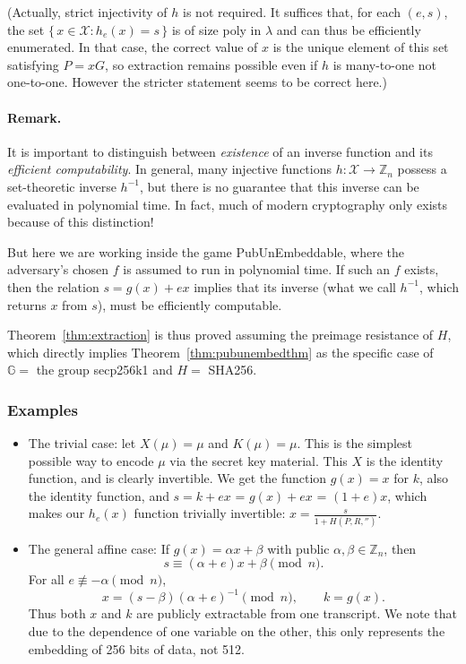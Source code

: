 \documentclass[10pt,a4paper]{article}
\theoremstyle{definition}   %
\theoremstyle{remark}       %
\newcommand{\G}{\mathbb{G}}
\begin{document}
(Actually, strict injectivity of $h$ is not required. It suffices that, for each $(e,s)$, the set
$\{\,x \in \mathcal{X} : h_e(x) = s\,\}$ is of size poly in $\lambda$ and can thus be efficiently enumerated. In that case, the correct value of $x$ is the unique element of this set satisfying $P = xG$, so extraction remains possible even if $h$ is many-to-one not one-to-one. However the stricter statement seems to be correct here.)

\vskip 0.2in

\paragraph{Remark.}
It is important to distinguish between \emph{existence} of an inverse
function and its \emph{efficient computability}.
In general, many injective functions $h:\mathcal X \to \mathbb{Z}_n$
possess a set-theoretic inverse $h^{-1}$, but there is no guarantee that
this inverse can be evaluated in polynomial time.
In fact, much of modern cryptography only exists because of this distinction!

But here we are working inside the game PubUnEmbeddable, where
the adversary's chosen $f$ is assumed to run in polynomial time.
If such an $f$ exists, then the relation $s = g(x)+ex$ implies that its inverse (what we call $h^{-1}$, which returns $x$ from $s$), must be efficiently computable.

\vskip 0.2in

Theorem~\ref{thm:extraction} is thus proved assuming the preimage resistance of $H$, which directly implies Theorem~\ref{thm:pubunembedthm} as the specific case of $\G =$ the group secp256k1 and $H =$ SHA256.


\subsubsection*{Examples}

\begin{itemize}
\item The trivial case: let $X(\mu) = \mu$ and $K(\mu) = \mu$. This is the simplest possible way to encode $\mu$ via the secret key material. This $X$ is the identity function, and is clearly invertible. We get the function $g(x) = x$ for $k$, also the identity function, and $s = k + ex$ = $g(x) + ex$ = $(1+e)x$, which makes our $h_e(x)$ function trivially invertible: $x = \frac{s}{1 + H(P, R, '')}$.
\item The general affine case: If $g(x)=\alpha x+\beta$ with public $\alpha,\beta\in\mathbb{Z}_n$, then
\[
s \equiv (\alpha+e)x + \beta \pmod n.
\]
For all $e\not\equiv -\alpha \pmod n$,
\[
x = (s-\beta)(\alpha+e)^{-1}\pmod n,\qquad k=g(x).
\]
Thus both $x$ and $k$ are publicly extractable from one transcript. We note that due to the dependence of one variable on the other, this only represents the embedding of 256 bits of data, not 512.
\end{itemize}
\end{document}
